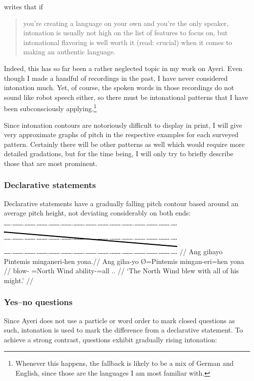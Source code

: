 \citet[66]{peterson2015} writes that if \blockquote{you're creating a language 
on your own and you're the only speaker, intonation is usually not high on the 
list of features to focus on, but intonational flavoring is well worth it 
(read: crucial) when it comes to making an authentic language.} Indeed, this 
has so far been a rather neglected topic in my work on Ayeri. Even though I 
made a handful of recordings in the past, I have never considered intonation 
much. Yet, of course, the spoken words in those recordings do not sound like 
robot speech either, so there must be intonational patterns that I have been 
subconsciously applying.\footnote{Whenever this happens, the fallback is 
likely to be a mix of German and English, since those are the languages I am 
most familiar with.}

Since intonation contours are notoriously difficult to display in print, I will 
give very approximate graphs of pitch in the respective examples for each 
surveyed pattern. Certainly there will be other patterns as well which would 
require more detailed gradations, but for the time being, I will only try to 
briefly describe those that are most prominent.

\subsubsection{Declarative statements}

Declarative statements have a gradually falling pitch contour based 
around an average pitch height, not deviating considerably on both ends:

\ex[belowexskip=0em]\begingl
	\glpreamble \raisebox{-1.5em}
		{\includegraphics{images/contours-statement.pdf}} //
	\gla Ang gihayo Pintemis minganeri-hen yona.//
	\glb Ang giha-yo Ø=Pintemis mingan-eri=hen yona //
	\glc \AgtT{} blow-\TsgN{} \Top{}={North Wind} ability-\Ins{}=all
		\TsgN{}.\Gen{}. //
	\glft `The North Wind blew with all of his might.' //
\endgl\xe

\subsubsection{Yes–no questions}

Since Ayeri does not use a particle or word order to mark closed questions as 
such, intonation is used to mark the difference from a declarative statement. 
To achieve a strong contrast, questions exhibit gradually rising intonation:

